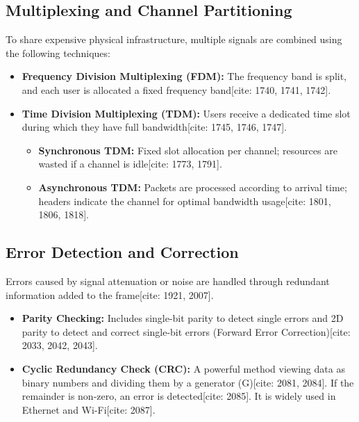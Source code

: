 \documentclass[12pt,a4paper]{article}
\begin{document}
\subsection*{Multiplexing and Channel Partitioning}
To share expensive physical infrastructure, multiple signals are combined using the following techniques:
\begin{itemize}
    \item \textbf{Frequency Division Multiplexing (FDM):} The frequency band is split, and each user is allocated a fixed frequency band[cite: 1740, 1741, 1742].
    \item \textbf{Time Division Multiplexing (TDM):} Users receive a dedicated time slot during which they have full bandwidth[cite: 1745, 1746, 1747].
    \begin{itemize}
        \item \textbf{Synchronous TDM:} Fixed slot allocation per channel; resources are wasted if a channel is idle[cite: 1773, 1791].
        \item \textbf{Asynchronous TDM:} Packets are processed according to arrival time; headers indicate the channel for optimal bandwidth usage[cite: 1801, 1806, 1818].
    \end{itemize}
\end{itemize}

\subsection*{Error Detection and Correction}
Errors caused by signal attenuation or noise are handled through redundant information added to the frame[cite: 1921, 2007].
\begin{itemize}
    \item \textbf{Parity Checking:} Includes single-bit parity to detect single errors and 2D parity to detect and correct single-bit errors (Forward Error Correction)[cite: 2033, 2042, 2043].
    \item \textbf{Cyclic Redundancy Check (CRC):} A powerful method viewing data as binary numbers and dividing them by a generator (G)[cite: 2081, 2084]. If the remainder is non-zero, an error is detected[cite: 2085]. It is widely used in Ethernet and Wi-Fi[cite: 2087].
\end{itemize}
\end{document}
